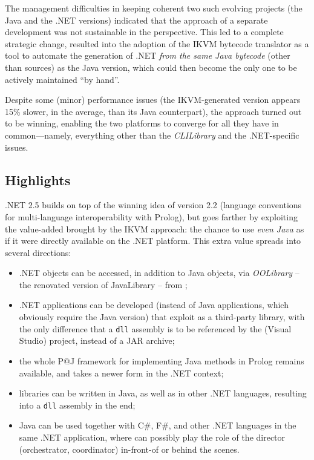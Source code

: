 The management difficulties in keeping coherent two such evolving projects (the Java and the .NET versions) indicated that the approach of a separate development was not sustainable in the perspective.
This led to a complete strategic change, resulted into the adoption of the IKVM \cite{ikvm} bytecode translator as a tool to automate the generation of \tuprolog.NET \textit{from the same Java bytecode} (other than sources) as the Java version, which could then become the only one to be actively maintained ``by hand''.

Despite some (minor) performance issues (the IKVM-generated \tuprolog{} version appears 15\% slower, in the average, than its Java counterpart), the approach turned out to be winning, enabling the two platforms to converge for all they have in common---namely, everything other than the \textit{CLILibrary} and the .NET-specific issues.

\subsection{Highlights}
\label{ssec:dotnet-highligths}

\tuprolog{}.NET 2.5 builds on top of the winning idea of version 2.2 (language conventions for multi-language interoperability with Prolog), but goes farther by exploiting the value-added brought by the IKVM approach: the chance to use \textit{even Java} as if it were directly available on the .NET platform.
%
This extra value spreads into several directions:
\begin{itemize}
  \item .NET objects can be accessed, in addition to Java objects, via       \textit{OOLibrary} -- the renovated version of JavaLibrary -- from \tuprolog{};

  \item .NET applications can be developed (instead of Java applications, which obviously require the \tuprolog{} Java version) that exploit \tuprolog{} as a third-party library, with the only difference that a \texttt{dll} assembly is to be referenced by the (Visual Studio) project, instead of a JAR archive;

  \item the whole P@J framework for implementing Java methods in Prolog remains available, and takes a newer form in the .NET context;

  \item \tuprolog{} libraries can be written in Java, as well as in other .NET languages, resulting into a \texttt{dll} assembly in the end;

  \item Java can be used together with C\#, F\#, and other .NET languages in the same .NET application, where \tuprolog{} can possibly play the role of the director (orchestrator, coordinator) in-front-of or behind the scenes.
\end{itemize}


